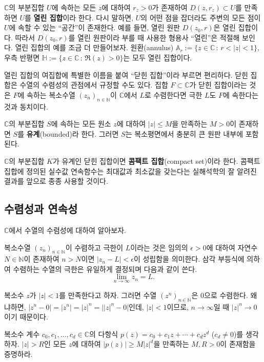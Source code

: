 $\mathbb C$의 부분집합 $U$에 속하는
모든 $z$에 대하여 $r_z>0$가 존재하여 $D(z,r_z)\subset U$를 만족하면
$U$를 {\bf 열린 집합}이라 한다.
다시 말하면, $U$의 어떤 점을 잡더라도 
주변의 모든 점이 $U$에 속할 수 있는 ``공간''이 존재한다.
예를 들면, 열린 원판 $D(z_0,r)$은 열린 집합이다.
따라서  $D(z_0,r)$를 열린 원판이라 부를 때 사용한 형용사 ``열린''은 적절해 보인다.
열린 집합의 예를 조금 더 만들어보자.
원환(annulus) $\mathbb A_r := \{ z\in\mathbb C\,:\, r<|z|<1\}$,
우측 반평면 $\mathbb H:= \{z\in\mathbb C\,:\, \Re(z)>0\}$는 모두 열린 집합이다.

열린 집합의 여집합에 특별한 이름을 붙여 ``닫힌 집합''이라 부르면 편리하다.
닫힌 집합은 수열의 수렴성의 관점에서 규정할 수도 있다.
집합 $F\subset \mathbb C$가 닫힌 집합이라는 것은
$F$에 속하는 복소수열 $(z_n)_{n\in\mathbb N}$이  $\mathbb C$에서 $L$로 수렴한다면
극한 $L$도 $F$에 속한다는 것과 동치이다.

$\mathbb C$의 부분집합 $S$에 속하는 모든 원소 $z$에 대하여
$|z|\le M$을 만족하는 $M>0$이 존재하면 $S$를 {\bf 유계}(bounded)라 한다.
그러면 $S$는 복소평면에서 충분히 큰 원판 내부에 포함된다.

$\mathbb C$의 부분집합 $K$가 유계인 닫힌 집합이면 {\bf 콤팩트 집합}(compact set)이라 한다.
콤팩트 집합에 정의된 실수값 연속함수는 최대값과 최소값을 갖는다는
실해석학의 잘 알려진 결과를
앞으로 종종 사용할 것이다.

\subsection{수렴성과 연속성}

$\mathbb C$에서 수열의 수렴성에 대하여 알아보자.
 
복소수열 $(z_n)_{n\in\mathbb N}$이 수렴하고 극한이 $L$이라는 것은
임의의 $\epsilon>0$에 대하여 자연수 $N\in\mathbb N$이 존재하여
 $n>N$이면 $|z_n -L| < \epsilon$이 성립함을 의미한다.
삼각 부등식에 의하여 수렴하는 수열의 극한은 유일하게 결정되며
다음과 같이 쓴다.
$$
\lim_{n\to\infty} z_n = L.
$$

\begin{saltexample}[label=example-1-1]{}{}
복소수 $z$가 $|z|<1$를 만족한다고 하자.
그러면 수열 $(z^n)_{n\in\mathbb N}$은 $0$으로 수렴한다.
왜냐하면, $|z^n-0| = |z^n| = |z|^n = \big||z|^n-0\big|$인데,
$|z|<1$이므로, $n\to\infty$일 때 $|z|^n\to0$이기 때문이다.
\end{saltexample}

\begin{salt_exercise} \label{ex-1-24}
복소수 계수 $c_0, c_1, \ldots, c_d\in \mathbb C$의
다항식 $p(z)=c_0 + c_1z + \cdots + c_dz^d$ ($c_d\ne0$)를 생각하자.
$|z|>R$인 모든 $z$에 대하여 $|p(z)| \ge M|z|^d$을 만족하는
$M, R>0$이 존재함을 증명하라.
\end{salt_exercise}

